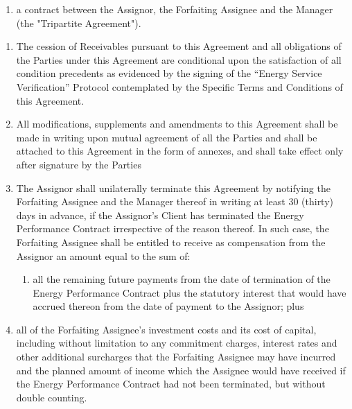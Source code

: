\documentclass[a4paper]{article}
\begin{document}
\begin{multicols}{2}
\begin{enumerate}
\begin{enumerate}
    \item{a contract between the Assignor, the Forfaiting Assignee and
        the Manager (the "Tripartite Agreement").}
    \end{enumerate}
  \end{enumerate}

  \begin{enumerate}
    \subsection{TERM OF THE AGREEMENT}

  \item{The cession of Receivables pursuant to this Agreement and all
      obligations of the Parties under this Agreement are conditional
      upon the satisfaction of all condition precedents as evidenced
      by the signing of the “Energy Service Verification” Protocol contemplated by
      the Specific Terms and Conditions of this Agreement.}

  \item{All modifications, supplements and amendments to this
      Agreement shall be made in writing upon mutual agreement of all
      the Parties and shall be attached to this Agreement in the form
      of annexes, and shall take effect only after signature by the
      Parties }

  \item{The Assignor shall unilaterally terminate this Agreement by
      notifying the Forfaiting Assignee and the Manager thereof in
      writing at least 30 (thirty) days in advance, if the Assignor’s
      Client has terminated the Energy Performance Contract
      irrespective of the reason thereof. In such case, the Forfaiting
      Assignee shall be entitled to receive as compensation from the
      Assignor an amount equal to the sum of: }

    \begin{enumerate}
    \item{all the remaining future payments from the date of
        termination of the Energy Performance Contract plus the
        statutory interest that would have accrued thereon from the
        date of payment to the Assignor; plus}
    \end{enumerate}

  \item{all of the Forfaiting Assignee’s investment costs and its cost
      of capital, including without limitation to any commitment
      charges, interest rates and other additional surcharges that the
      Forfaiting Assignee may have incurred and the planned amount of
      income which the Assignee would have received if the Energy
      Performance Contract had not been terminated, but without double
      counting.}


\end{enumerate}
\end{multicols}
\end{document}

